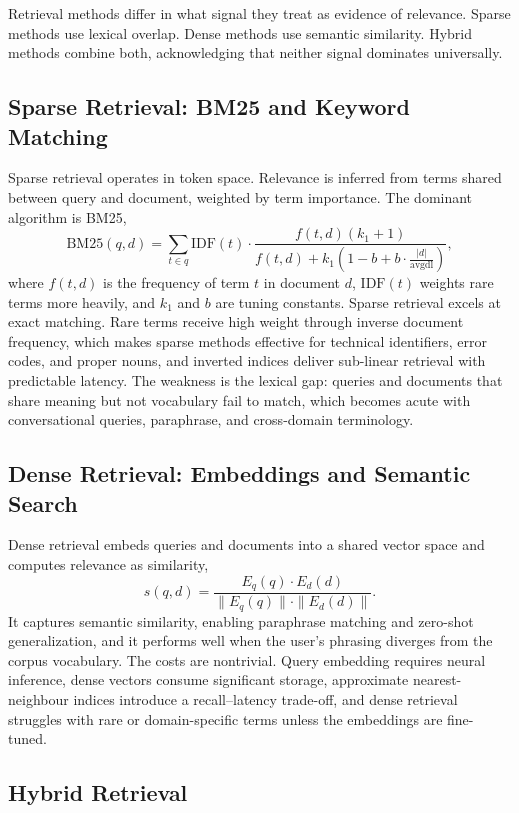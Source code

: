 \documentclass[11pt]{book}
\begin{document}
Retrieval methods differ in what signal they treat as evidence of relevance. Sparse methods use lexical overlap. Dense methods use semantic similarity. Hybrid methods combine both, acknowledging that neither signal dominates universally.

\subsection{Sparse Retrieval: BM25 and Keyword Matching}

Sparse retrieval operates in token space. Relevance is inferred from terms shared between query and document, weighted by term importance. The dominant algorithm is BM25,
\[
\text{BM25}(q, d) = \sum_{t \in q} \text{IDF}(t) \cdot \frac{f(t, d)(k_1 + 1)}{f(t, d) + k_1\left(1 - b + b \cdot \frac{|d|}{\text{avgdl}}\right)},
\]
where $f(t,d)$ is the frequency of term $t$ in document $d$, $\text{IDF}(t)$ weights rare terms more heavily, and $k_1$ and $b$ are tuning constants. Sparse retrieval excels at exact matching. Rare terms receive high weight through inverse document frequency, which makes sparse methods effective for technical identifiers, error codes, and proper nouns, and inverted indices deliver sub-linear retrieval with predictable latency. The weakness is the lexical gap: queries and documents that share meaning but not vocabulary fail to match, which becomes acute with conversational queries, paraphrase, and cross-domain terminology.

\subsection{Dense Retrieval: Embeddings and Semantic Search}

Dense retrieval embeds queries and documents into a shared vector space and computes relevance as similarity,
\[
s(q,d) = \frac{E_q(q) \cdot E_d(d)}{\|E_q(q)\| \cdot \|E_d(d)\|}.
\]
It captures semantic similarity, enabling paraphrase matching and zero-shot generalization, and it performs well when the user's phrasing diverges from the corpus vocabulary. The costs are nontrivial. Query embedding requires neural inference, dense vectors consume significant storage, approximate nearest-neighbour indices introduce a recall--latency trade-off, and dense retrieval struggles with rare or domain-specific terms unless the embeddings are fine-tuned.

\subsection{Hybrid Retrieval}
\end{document}
